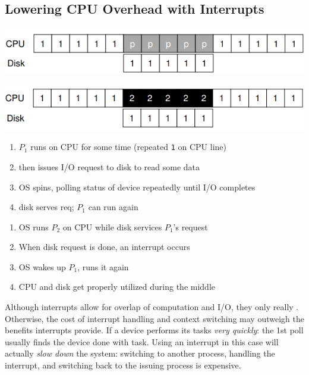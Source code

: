 \documentclass[8pt,a4paper,landscape]{extarticle}
\begin{document}
\begin{multicols*}{3}
\section*{Lowering CPU Overhead with Interrupts}
\begin{minipage}{.5\linewidth}
\includegraphics[width=\linewidth]{imgs/iopolling}
\end{minipage}
\begin{minipage}{.5\linewidth}
\includegraphics[width=\linewidth]{imgs/iointerrupt}
\end{minipage}
\begin{minipage}{.5\linewidth}
  \flushleft
  \begin{enumerate}
  \item $P_1$ runs on CPU for some time (repeated \texttt{1} on CPU line)
  \item then issues I/O request to disk to read some data
  \item OS spins, polling status of device repeatedly until I/O completes
  \item disk serves req; $P_1$ can run again
  \end{enumerate}
\end{minipage}
\begin{minipage}{.5\linewidth}
  \flushleft
  \begin{enumerate}
  \item OS runs $P_2$ on CPU while disk services $P_1$'s request
  \item When disk request is done, an interrupt occurs
  \item OS wakes up $P_1$, runs it again
  \item {} CPU and disk get properly utilized during the middle
  \end{enumerate}
\end{minipage}
\begin{tcolorbox}[left=0mm, top=1mm, right=0mm, rightlower=0mm, bottom=1mm,
  title= Interrupts \mr{NOT always} better than polling,
  halign title=center]
  Although interrupts allow for overlap of computation and I/O, they only
  really . Otherwise, the cost of interrupt handling and context switching may outweigh the benefits interrupts provide.  If a device performs its tasks \emph{very quickly}: the 1st poll usually finds the device done with task. Using an interrupt in this case will actually \emph{slow down} the system: switching to another process, handling the interrupt, and switching back to the issuing process is expensive.


\end{tcolorbox}
\end{multicols*}
\end{document}
